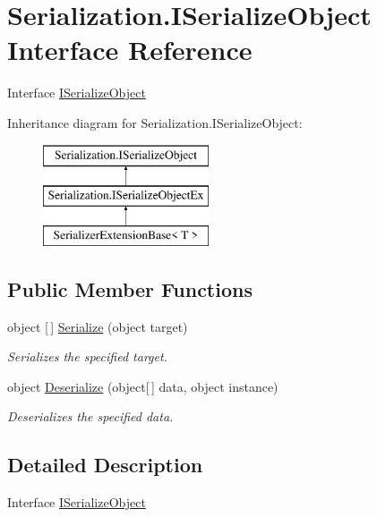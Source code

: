 \hypertarget{interface_serialization_1_1_i_serialize_object}{}\section{Serialization.\+I\+Serialize\+Object Interface Reference}
\label{interface_serialization_1_1_i_serialize_object}


Interface \hyperlink{interface_serialization_1_1_i_serialize_object}{I\+Serialize\+Object}  


Inheritance diagram for Serialization.\+I\+Serialize\+Object\+:\begin{figure}[H]
\begin{center}
\leavevmode
\includegraphics[height=3.000000cm]{interface_serialization_1_1_i_serialize_object}
\end{center}
\end{figure}
\subsection*{Public Member Functions}
\begin{DoxyCompactItemize}
\item 
object \mbox{[}$\,$\mbox{]} \hyperlink{interface_serialization_1_1_i_serialize_object_a4e84ab8859d2e9921ee7d4d0eda0da97}{Serialize} (object target)
\begin{DoxyCompactList}\small\item\em Serializes the specified target. \end{DoxyCompactList}\item 
object \hyperlink{interface_serialization_1_1_i_serialize_object_a100975fc581fdc4e4d29759daef4b99e}{Deserialize} (object\mbox{[}$\,$\mbox{]} data, object instance)
\begin{DoxyCompactList}\small\item\em Deserializes the specified data. \end{DoxyCompactList}\end{DoxyCompactItemize}


\subsection{Detailed Description}
Interface \hyperlink{interface_serialization_1_1_i_serialize_object}{I\+Serialize\+Object} 



